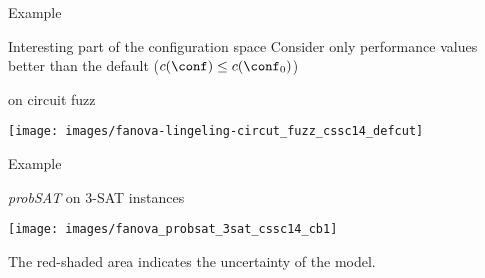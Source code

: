 \begin{frame}[c]{\fanova{} Example}

\begin{block}{Interesting part of the configuration space}
Consider only performance values better than the default ($c(\conf) \leq c(\conf_0)$)
\end{block}

\centering
\lingeling{} on circuit fuzz

\texttt{[image: images/fanova-lingeling-circut\_fuzz\_cssc14\_defcut]}

\end{frame}
% 
% 
% 
\begin{frame}[c]{\fanova{} Example}

\centering
\textit{probSAT} on 3-SAT instances

\texttt{[image: images/fanova\_probsat\_3sat\_cssc14\_cb1]}

\bigskip
The red-shaded area indicates the uncertainty of the model.

\end{frame}
